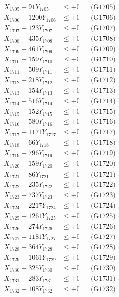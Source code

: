 \documentclass[a4paper,10pt]{article}
\begin{document}
{\begin{align}
X_{1705} - 91Y_{1705} &\leq +0 && \text{(G1705)} \\
X_{1706} - 1200Y_{1706} &\leq +0 && \text{(G1706)} \\
X_{1707} - 123Y_{1707} &\leq +0 && \text{(G1707)} \\
X_{1708} - 435Y_{1708} &\leq +0 && \text{(G1708)} \\
X_{1709} - 461Y_{1709} &\leq +0 && \text{(G1709)} \\
X_{1710} - 159Y_{1710} &\leq +0 && \text{(G1710)} \\
\allowbreak
X_{1711} - 509Y_{1711} &\leq +0 && \text{(G1711)} \\
X_{1712} - 218Y_{1712} &\leq +0 && \text{(G1712)} \\
X_{1713} - 154Y_{1713} &\leq +0 && \text{(G1713)} \\
X_{1714} - 516Y_{1714} &\leq +0 && \text{(G1714)} \\
X_{1715} - 152Y_{1715} &\leq +0 && \text{(G1715)} \\
X_{1716} - 580Y_{1716} &\leq +0 && \text{(G1716)} \\
X_{1717} - 1171Y_{1717} &\leq +0 && \text{(G1717)} \\
X_{1718} - 66Y_{1718} &\leq +0 && \text{(G1718)} \\
X_{1719} - 796Y_{1719} &\leq +0 && \text{(G1719)} \\
X_{1720} - 159Y_{1720} &\leq +0 && \text{(G1720)} \\
\allowbreak
X_{1721} - 86Y_{1721} &\leq +0 && \text{(G1721)} \\
X_{1722} - 235Y_{1722} &\leq +0 && \text{(G1722)} \\
X_{1723} - 737Y_{1723} &\leq +0 && \text{(G1723)} \\
X_{1724} - 2217Y_{1724} &\leq +0 && \text{(G1724)} \\
X_{1725} - 1261Y_{1725} &\leq +0 && \text{(G1725)} \\
X_{1726} - 274Y_{1726} &\leq +0 && \text{(G1726)} \\
X_{1727} - 1181Y_{1727} &\leq +0 && \text{(G1727)} \\
X_{1728} - 364Y_{1728} &\leq +0 && \text{(G1728)} \\
X_{1729} - 1061Y_{1729} &\leq +0 && \text{(G1729)} \\
X_{1730} - 325Y_{1730} &\leq +0 && \text{(G1730)} \\
\allowbreak
X_{1731} - 283Y_{1731} &\leq +0 && \text{(G1731)} \\
X_{1732} - 108Y_{1732} &\leq +0 && \text{(G1732)} \\

\end{align}}
\end{document}
